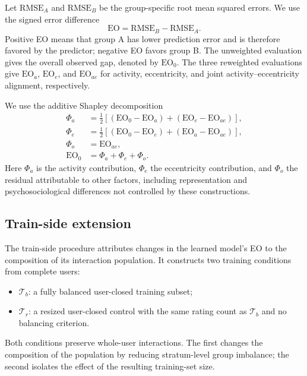 \documentclass[11pt]{article}
\begin{document}
Let $\mathrm{RMSE}_A$ and $\mathrm{RMSE}_B$ be the group-specific root mean
squared errors. We use the signed error difference
\begin{equation}
        \mathrm{EO}=\mathrm{RMSE}_B-\mathrm{RMSE}_A.
    \label{eq:signed-eo}
\end{equation}
Positive EO means that group A has lower prediction error and is therefore
favored by the predictor; negative EO favors group B. The unweighted
evaluation gives the overall observed gap, denoted by $\mathrm{EO}_0$. The
three reweighted evaluations give $\mathrm{EO}_a$, $\mathrm{EO}_e$, and
$\mathrm{EO}_{ae}$ for activity, eccentricity, and joint activity--eccentricity
alignment, respectively. 

We use the additive Shapley decomposition
\begin{align}
    \Phi_a &= \tfrac12[(\mathrm{EO}_0-\mathrm{EO}_a)+
        (\mathrm{EO}_e-\mathrm{EO}_{ae})],\\
    \Phi_e &= \tfrac12[(\mathrm{EO}_0-\mathrm{EO}_e)+
        (\mathrm{EO}_a-\mathrm{EO}_{ae})],\\
    \Phi_o &= \mathrm{EO}_{ae},\\
    \mathrm{EO}_0 &= \Phi_a+\Phi_e+\Phi_o.
    \label{eq:eo-decomposition}
\end{align}
Here $\Phi_a$ is the activity contribution, $\Phi_e$ the eccentricity
contribution, and $\Phi_o$ the residual attributable to other factors, including representation and
psychosociological differences not controlled by these constructions. 

\subsection{Train-side extension}
\label{sec:training-intervention}

The train-side procedure attributes changes in the learned model's EO to the
composition of its interaction population. It constructs two training
conditions from complete users:
\begin{itemize}
    \item $\mathcal T_b$: a fully balanced user-closed training subset;
    \item $\mathcal T_r$: a resized user-closed control with the same rating
    count as $\mathcal T_b$ and no balancing criterion.
\end{itemize}
Both conditions preserve whole-user interactions. The first changes the
composition of the population by reducing stratum-level group imbalance; the
second isolates the effect of the resulting training-set size.
\end{document}
